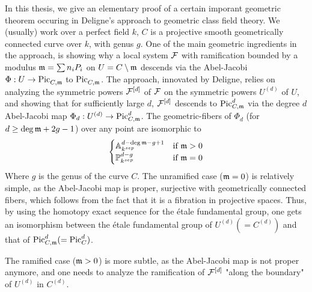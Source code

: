 In this thesis, we give an elementary proof of a certain imporant geometric theorem occuring in Deligne's approach to geometric class field theory.
We (usually) work over a perfect field $k$, $C$ is a projective smooth geometrically connected curve over $k$, with genus $g$.
One of the main geometric ingredients in the approach, is showing why a local system $\cF$ with ramification bounded by a modulus $\mdls = \sum n_i P_i$ on $U = C \setminus \mdls$ descends via the Abel-Jacobi $\Phi: U \to \PicCm[]$ to $\PicCm[]$. 
The approach, innovated by Deligne, relies on analyzing the symmetric powers $\cF^{[d]}$ of $\cF$ on the symmetric powers $U^{(d)}$ of $U$,
and showing that for sufficiently large $d$, $\cF^{[d]}$ descends to $\PicCm[d]$ via the degree $d$ Abel-Jacobi map $\Phi_d : U^{(d)} \to \PicCm[d]$.
The geometric-fibers of $\Phi_d$ (for $d \geq \deg \mdls +  2g - 1$) over any point are isomorphic to 
$$
\begin{cases}
\mathbb{A}_{k^{sep}}^{d - \deg \mdls - g + 1} & \text{if } \mdls > 0 \\
\mathbb{P}_{k^{sep}}^{d - g} & \text{if } \mdls = 0
\end{cases}
$$
Where $g$ is the genus of the curve $C$.
The unramified case ($\mdls = 0$) is relatively simple, as the Abel-Jacobi map is proper, surjective with geometrically connected fibers, which follows from the fact that it is a fibration in projective spaces.
Thus, by using the homotopy exact sequence for the \'etale fundamental group,
one gets an isomorphism between the \'etale fundamental group of $U^{(d)} (=C^{(d)})$ and that of $\PicCm[d] (=\PicC[d])$.

The ramified case ($\mdls > 0$) is more subtle, as the Abel-Jacobi map is not proper anymore, and one needs to analyze the ramification of $\cF^{[d]}$ "along the boundary" of $U^{(d)}$ in $C^{(d)}$.


